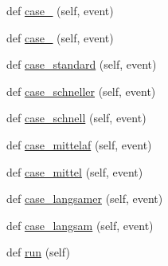 \begin{DoxyCompactItemize}
\item 
def \hyperlink{class_f_i_n_a_l___g_u_i___w_l_a_n_1_1_w_l_a_n_ad19edd013fc170682baac727057a5155}{case\+\_} (self, event)
\item 
def \hyperlink{class_f_i_n_a_l___g_u_i___w_l_a_n_1_1_w_l_a_n_ad9a73c955c581f35964a55f79b9891ec}{case\+\_} (self, event)
\item 
def \hyperlink{class_f_i_n_a_l___g_u_i___w_l_a_n_1_1_w_l_a_n_a0727b5c8ed1339b9c3a5bc7c290a9502}{case\+\_\+standard} (self, event)
\item 
def \hyperlink{class_f_i_n_a_l___g_u_i___w_l_a_n_1_1_w_l_a_n_aaeaf91e8d510f91d1830a4b428354de8}{case\+\_\+schneller} (self, event)
\item 
def \hyperlink{class_f_i_n_a_l___g_u_i___w_l_a_n_1_1_w_l_a_n_a00166245d4f6c4df9e40ecaffa66d0eb}{case\+\_\+schnell} (self, event)
\item 
def \hyperlink{class_f_i_n_a_l___g_u_i___w_l_a_n_1_1_w_l_a_n_afa11b6a032018490f3f7e7c9d2efd0bf}{case\+\_\+mittelaf} (self, event)
\item 
def \hyperlink{class_f_i_n_a_l___g_u_i___w_l_a_n_1_1_w_l_a_n_a5b05b7870d7878a5acc142d81c908b2b}{case\+\_\+mittel} (self, event)
\item 
def \hyperlink{class_f_i_n_a_l___g_u_i___w_l_a_n_1_1_w_l_a_n_a307f1abe3cdb76fb877c4267dceb0c82}{case\+\_\+langsamer} (self, event)
\item 
def \hyperlink{class_f_i_n_a_l___g_u_i___w_l_a_n_1_1_w_l_a_n_acc83d940a64c2af519b20fb3b0f1875d}{case\+\_\+langsam} (self, event)
\item 
def \hyperlink{class_f_i_n_a_l___g_u_i___w_l_a_n_1_1_w_l_a_n_a0a597b89e22f363d7fe7e01e561693b4}{run} (self)
\end{DoxyCompactItemize}
